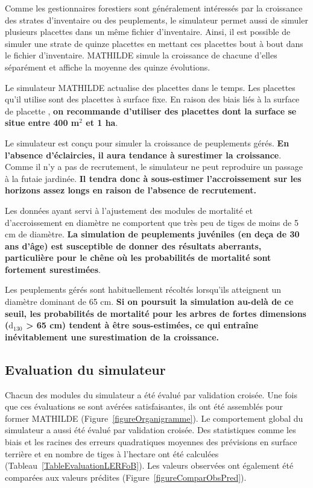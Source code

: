 \documentclass[a4paper,12pt]{article}
\begin{document}
Comme les gestionnaires forestiers sont généralement intéressés par la croissance des strates d'inventaire ou des peuplements, le simulateur permet aussi de simuler plusieurs placettes dans un même fichier d'inventaire. Ainsi, il est possible de simuler une strate de quinze placettes en mettant ces placettes bout à bout dans le fichier d'inventaire. MATHILDE simule la croissance de chacune d'elles séparément et affiche la moyenne des quinze évolutions.

Le simulateur MATHILDE actualise des placettes dans le temps. Les placettes qu'il utilise sont des placettes à surface fixe. En raison des biais liés à la surface de placette \citep[cf.][]{sambakhe_bias_2014}, \textbf{on recommande d'utiliser des placettes dont la surface se situe entre 400 m$^2$ et 1 ha}. 

Le simulateur est conçu pour simuler la croissance de peuplements gérés. \textbf{En l'absence d'éclaircies, il aura tendance à surestimer la croissance}. Comme il n'y a pas de recrutement, le simulateur ne peut reproduire un passage à la futaie jardinée. \textbf{Il tendra donc à sous-estimer l'accroissement sur les horizons assez longs en raison de l'absence de recrutement.}

Les données ayant servi à l'ajustement des modules de mortalité et d'accroissement en diamètre ne comportent que très peu de tiges de moins de 5 cm de diamètre. \textbf{La simulation de peuplements juvéniles (en deça de 30 ans d'âge) est susceptible de donner des résultats aberrants, particulière pour le chêne où les probabilités de mortalité sont fortement surestimées}. 

Les peuplements gérés sont habituellement récoltés lorsqu'ils atteignent un diamètre dominant de 65 cm. \textbf{Si on poursuit la simulation au-delà de ce seuil, les probabilités de mortalité pour les arbres de fortes dimensions ($\text{d}_{130}$ > 65 cm) tendent à être sous-estimées, ce qui entraîne inévitablement une surestimation de la croissance.}

\subsection{Evaluation du simulateur}

Chacun des modules du simulateur a été évalué par validation croisée. Une fois que ces évaluations se sont avérées satisfaisantes, ils ont été assemblés pour former MATHILDE (Figure~\ref{figureOrganigramme}). Le comportement global du simulateur a aussi été évalué par validation croisée. Des statistiques comme les biais et les racines des erreurs quadratiques moyennes des prévisions en surface terrière et en nombre de tiges à l'hectare ont été calculées (Tableau~\ref{TableEvaluationLERFoB}). Les valeurs observées ont également été comparées aux valeurs prédites (Figure~\ref{figureComparObsPred}).
\end{document}
